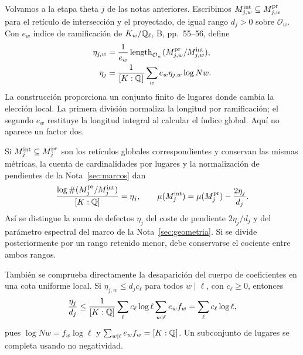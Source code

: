 Volvamos a la etapa theta $j$ de las notas anteriores.
Escribimos $M^{\rm int}_{j,w}\subseteq M^{\rm pr}_{j,w}$
para el retículo de intersección y el proyectado, de igual
rango $d_j>0$ sobre $\mathcal O_w$.
Con $e_w$ índice de ramificación de $K_w/\mathbb{Q}_\ell$,
B, pp.~55--56, define
\begin{equation}
 \begin{aligned}
 \eta_{j,w}
   &=\frac{1}{e_w}\operatorname{length}_{\mathcal O_w}
       (M^{\rm pr}_{j,w}/M^{\rm int}_{j,w}),\\
 \eta_j
   &=\frac{1}{[K:\mathbb{Q}]}
       \sum_w e_w\eta_{j,w}\log Nw.
 \end{aligned}
 \label{eq:cohom-indices}
\end{equation}
La construcción proporciona un conjunto finito de lugares
donde cambia la elección local.
La primera división normaliza la longitud por ramificación;
el segundo $e_w$ restituye la longitud integral al calcular
el índice global. Aquí no aparece un factor dos.

Si $M^{\rm int}_j\subseteq M^{\rm pr}_j$ son los retículos
globales correspondientes y conservan las mismas métricas,
la cuenta de cardinalidades por lugares y la normalización
de pendientes de la Nota~\ref{sec:marcos} dan
\begin{equation}
 \frac{\log\#(M^{\rm pr}_j/M^{\rm int}_j)}{[K:\mathbb{Q}]}
 =\eta_j,\qquad
 \mu(M^{\rm int}_j)
 =\mu(M^{\rm pr}_j)-\frac{2\eta_j}{d_j}.
 \label{eq:cohom-coste-pendiente}
\end{equation}
Así se distingue la suma de defectos $\eta_j$ del coste
de pendiente $2\eta_j/d_j$ y del parámetro espectral
del marco de la Nota~\ref{sec:geometria}.
Si se divide posteriormente por un rango retenido menor,
debe conservarse el cociente entre ambos rangos.

También se comprueba directamente la desaparición del
cuerpo de coeficientes en una cota uniforme local.
Si $\eta_{j,w}\le d_jc_\ell$ para todos $w\mid\ell$,
con $c_\ell\ge0$, entonces
\[
 \frac{\eta_j}{d_j}
 \le\frac{1}{[K:\mathbb{Q}]}
     \sum_\ell c_\ell\log\ell\sum_{w\mid\ell}e_wf_w
 =\sum_\ell c_\ell\log\ell,
\]
pues $\log Nw=f_w\log\ell$ y
$\sum_{w\mid\ell}e_wf_w=[K:\mathbb{Q}]$.
Un subconjunto de lugares se completa usando no negatividad.

